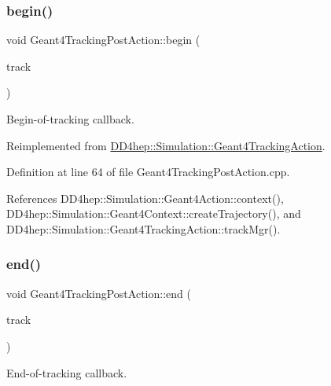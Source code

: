 \subsubsection{\texorpdfstring{begin()}{begin()}}
{\footnotesize\ttfamily void Geant4\+Tracking\+Post\+Action\+::begin (\begin{DoxyParamCaption}\item[{const G4\+Track $\ast$}]{track }\end{DoxyParamCaption})\hspace{0.3cm}{\ttfamily [virtual]}}



Begin-\/of-\/tracking callback. 



Reimplemented from \hyperlink{class_d_d4hep_1_1_simulation_1_1_geant4_tracking_action_a65858867a7b71bf4f48b9f140bc9a88d}{D\+D4hep\+::\+Simulation\+::\+Geant4\+Tracking\+Action}.



Definition at line 64 of file Geant4\+Tracking\+Post\+Action.\+cpp.



References D\+D4hep\+::\+Simulation\+::\+Geant4\+Action\+::context(), D\+D4hep\+::\+Simulation\+::\+Geant4\+Context\+::create\+Trajectory(), and D\+D4hep\+::\+Simulation\+::\+Geant4\+Tracking\+Action\+::track\+Mgr().

\hypertarget{class_d_d4hep_1_1_simulation_1_1_geant4_tracking_post_action_ac64fbbb53136a1696ac45c060fdcde70}{}\label{class_d_d4hep_1_1_simulation_1_1_geant4_tracking_post_action_ac64fbbb53136a1696ac45c060fdcde70} 
\subsubsection{\texorpdfstring{end()}{end()}}
{\footnotesize\ttfamily void Geant4\+Tracking\+Post\+Action\+::end (\begin{DoxyParamCaption}\item[{const G4\+Track $\ast$}]{track }\end{DoxyParamCaption})\hspace{0.3cm}{\ttfamily [virtual]}}



End-\/of-\/tracking callback. 



